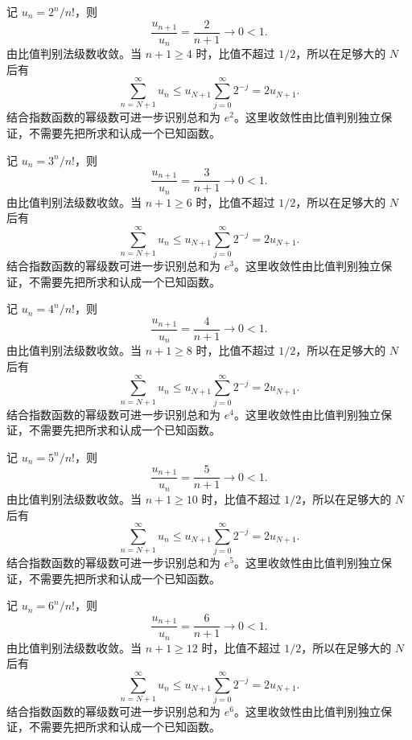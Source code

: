 \documentclass[UTF8,12pt,a4paper,fontset=fandol]{ctexart}
\begin{document}
\begin{solve}\label{ans:c24q14}
记 $u_n=2^n/n!$，则
\[
\frac{u_{n+1}}{u_n}=\frac{2}{n+1}\longrightarrow0<1.
\]
由比值判别法级数收敛。当 $n+1\ge 4$ 时，比值不超过 $1/2$，所以在足够大的 $N$ 后有
\[
\sum_{n=N+1}^\infty u_n\le u_{N+1}\sum_{j=0}^\infty2^{-j}=2u_{N+1}.
\]
结合指数函数的幂级数可进一步识别总和为 $e^{2}$。这里收敛性由比值判别独立保证，不需要先把所求和认成一个已知函数。
\end{solve}

\begin{solve}\label{ans:c24q15}
记 $u_n=3^n/n!$，则
\[
\frac{u_{n+1}}{u_n}=\frac{3}{n+1}\longrightarrow0<1.
\]
由比值判别法级数收敛。当 $n+1\ge 6$ 时，比值不超过 $1/2$，所以在足够大的 $N$ 后有
\[
\sum_{n=N+1}^\infty u_n\le u_{N+1}\sum_{j=0}^\infty2^{-j}=2u_{N+1}.
\]
结合指数函数的幂级数可进一步识别总和为 $e^{3}$。这里收敛性由比值判别独立保证，不需要先把所求和认成一个已知函数。
\end{solve}

\begin{solve}\label{ans:c24q16}
记 $u_n=4^n/n!$，则
\[
\frac{u_{n+1}}{u_n}=\frac{4}{n+1}\longrightarrow0<1.
\]
由比值判别法级数收敛。当 $n+1\ge 8$ 时，比值不超过 $1/2$，所以在足够大的 $N$ 后有
\[
\sum_{n=N+1}^\infty u_n\le u_{N+1}\sum_{j=0}^\infty2^{-j}=2u_{N+1}.
\]
结合指数函数的幂级数可进一步识别总和为 $e^{4}$。这里收敛性由比值判别独立保证，不需要先把所求和认成一个已知函数。
\end{solve}

\begin{solve}\label{ans:c24q17}
记 $u_n=5^n/n!$，则
\[
\frac{u_{n+1}}{u_n}=\frac{5}{n+1}\longrightarrow0<1.
\]
由比值判别法级数收敛。当 $n+1\ge 10$ 时，比值不超过 $1/2$，所以在足够大的 $N$ 后有
\[
\sum_{n=N+1}^\infty u_n\le u_{N+1}\sum_{j=0}^\infty2^{-j}=2u_{N+1}.
\]
结合指数函数的幂级数可进一步识别总和为 $e^{5}$。这里收敛性由比值判别独立保证，不需要先把所求和认成一个已知函数。
\end{solve}

\begin{solve}\label{ans:c24q18}
记 $u_n=6^n/n!$，则
\[
\frac{u_{n+1}}{u_n}=\frac{6}{n+1}\longrightarrow0<1.
\]
由比值判别法级数收敛。当 $n+1\ge 12$ 时，比值不超过 $1/2$，所以在足够大的 $N$ 后有
\[
\sum_{n=N+1}^\infty u_n\le u_{N+1}\sum_{j=0}^\infty2^{-j}=2u_{N+1}.
\]
结合指数函数的幂级数可进一步识别总和为 $e^{6}$。这里收敛性由比值判别独立保证，不需要先把所求和认成一个已知函数。
\end{solve}
\end{document}
